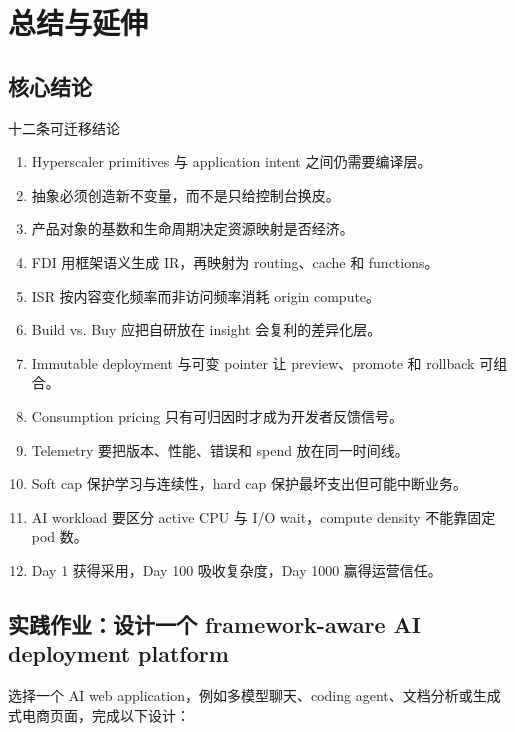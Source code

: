 \section{总结与延伸}

\subsection{核心结论}

\begin{importantbox}{十二条可迁移结论}
\begin{enumerate}
  \item Hyperscaler primitives 与 application intent 之间仍需要编译层。
  \item 抽象必须创造新不变量，而不是只给控制台换皮。
  \item 产品对象的基数和生命周期决定资源映射是否经济。
  \item FDI 用框架语义生成 IR，再映射为 routing、cache 和 functions。
  \item ISR 按内容变化频率而非访问频率消耗 origin compute。
  \item Build vs. Buy 应把自研放在 insight 会复利的差异化层。
  \item Immutable deployment 与可变 pointer 让 preview、promote 和 rollback 可组合。
  \item Consumption pricing 只有可归因时才成为开发者反馈信号。
  \item Telemetry 要把版本、性能、错误和 spend 放在同一时间线。
  \item Soft cap 保护学习与连续性，hard cap 保护最坏支出但可能中断业务。
  \item AI workload 要区分 active CPU 与 I/O wait，compute density 不能靠固定 pod 数。
  \item Day 1 获得采用，Day 100 吸收复杂度，Day 1000 赢得运营信任。
\end{enumerate}
\end{importantbox}

\subsection{实践作业：设计一个 framework-aware AI deployment platform}

选择一个 AI web application，例如多模型聊天、coding agent、文档分析或生成式电商页面，完成以下设计：

